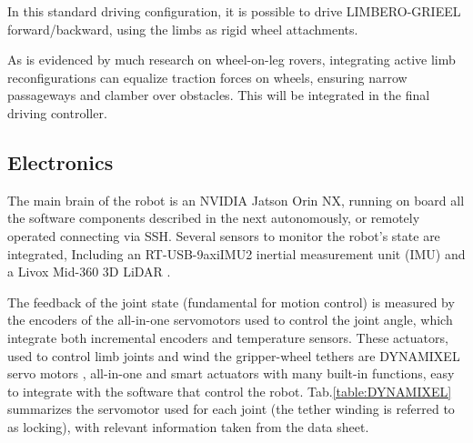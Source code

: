 In this standard driving configuration, it is possible to drive LIMBERO-GRIEEL forward/backward, using the limbs as rigid wheel attachments.

As is evidenced by much research on wheel-on-leg rovers, integrating active limb reconfigurations can equalize traction forces on wheels, ensuring narrow passageways and clamber over obstacles\cite{MAMMOTH}\cite{WheelLeggedStabilityOPT}\cite{WheleedLeggedLUNAR}\cite{WheeledLeggedAMAZONFOREST}. This will be integrated in the final driving controller.

\subsection{Electronics}
\label{sec:electronics}

The main brain of the robot is an NVIDIA Jatson Orin NX, running on board all the software components described in the next autonomously, or remotely operated connecting via SSH.
Several sensors to monitor the robot's state are integrated, Including an RT-USB-9axiIMU2 inertial measurement unit (IMU) and a Livox Mid-360 3D LiDAR \cite{LIMBEROTakadaThesis}.

The feedback of the joint state (fundamental for motion control) is measured by the encoders of the all-in-one servomotors used to control the joint angle, which integrate both incremental encoders and temperature sensors.
These actuators, used to control limb joints and wind the gripper-wheel tethers are DYNAMIXEL servo motors \cite{dynamixel}, all-in-one and smart actuators with many built-in functions, easy to integrate with the software that control the robot.
Tab.\ref{table:DYNAMIXEL} summarizes the servomotor used for each joint  (the tether winding is referred to as locking), with relevant information taken from the data sheet.

